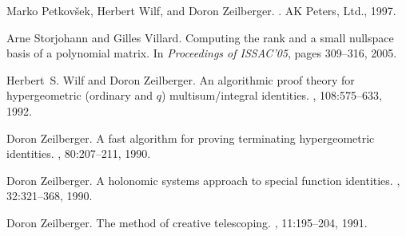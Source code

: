 \documentclass{sig-alternate}
\begin{document}
\begin{thebibliography}{10}
Marko Petkov{\v s}ek, Herbert Wilf, and Doron Zeilberger.
.
\newblock AK Peters, Ltd., 1997.

Arne Storjohann and Gilles Villard.
\newblock Computing the rank and a small nullspace basis of a polynomial
  matrix.
\newblock In {\em Proceedings of ISSAC'05}, pages 309--316, 2005.

Herbert~S. Wilf and Doron Zeilberger.
\newblock An algorithmic proof theory for hypergeometric (ordinary and $q$)
  multisum/integral identities.
, 108:575--633, 1992.

Doron Zeilberger.
\newblock A fast algorithm for proving terminating hypergeometric identities.
, 80:207--211, 1990.

Doron Zeilberger.
\newblock A holonomic systems approach to special function identities.
, 32:321--368,
  1990.

Doron Zeilberger.
\newblock The method of creative telescoping.
, 11:195--204, 1991.

\end{thebibliography}
\end{document}
